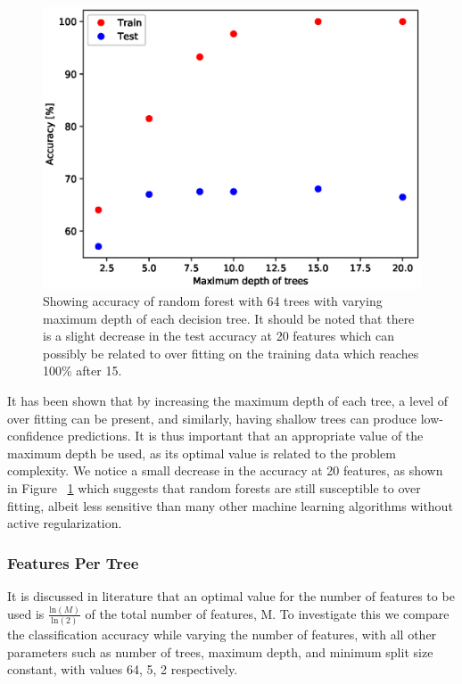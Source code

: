 \documentclass{article} %
\begin{document}
\begin{figure}[ht]
\begin{center}
\includegraphics[scale=0.4]{max_depth}
\end{center}
\caption{Showing accuracy of random forest with 64 trees with varying maximum depth of each decision tree. It should be noted that there is a slight decrease in the test accuracy at 20 features which can possibly be related to over fitting on the training data which reaches 100\% after 15.}
\label{fig:max_depth}
\end{figure}

It has been shown that by increasing the maximum depth of each tree, a level of over fitting can be present, and similarly, having shallow trees can produce low-confidence predictions. \cite{Criminisi2011} It is thus important that an appropriate value of the maximum depth be used, as its optimal value is related to the problem complexity. We notice a small decrease in the accuracy at 20 features, as shown in Figure ~\ref{fig:max_depth} which suggests that random forests are still susceptible to over fitting, albeit less sensitive than many other machine learning algorithms without active regularization.

\subsubsection{Features Per Tree}

It is discussed in literature that an optimal value for the number of features to be used is $\frac{\text{ln}(M)}{\text{ln}(2)}$ of the total number of features, M. \cite{Brieman01} To investigate this we compare the classification accuracy while varying the number of features, with all other parameters such as number of trees, maximum depth, and minimum split size constant, with values 64, 5, 2 respectively.
\end{document}
